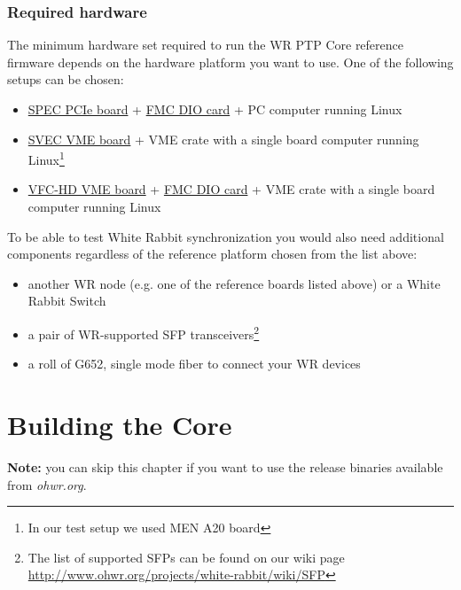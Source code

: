 \documentclass[a4paper, 12pt]{article}
\renewcommand{\_}{\underscore\allowbreak}
\begin{document}
\subsubsection{Required hardware}
\label{Required hardware}

The minimum hardware set required to run the WR PTP Core reference firmware
depends on the hardware platform you want to use. One of the following setups
can be chosen:
\begin{itemize}
\item \href{http://www.ohwr.org/projects/spec}{SPEC PCIe board} +
  \href{http://www.ohwr.org/projects/fmc-dio-5chttla}{FMC DIO card} + PC
  computer running Linux
\item \href{http://www.ohwr.org/projects/svec}{SVEC VME board} + VME crate with
  a single board computer running Linux\footnote{\label{note_a20}In our test setup
    we used MEN A20 board}
\item \href{http://www.ohwr.org/projects/vfc-hd}{VFC-HD VME board} +
  \href{http://www.ohwr.org/projects/fmc-dio-5chttla}{FMC DIO card} +
  VME crate with a single board computer running Linux
\end{itemize}

To be able to test White Rabbit synchronization you would also need
additional components regardless of the reference platform chosen from the list
above:
\begin{itemize}
  \item another WR node (e.g. one of the reference boards listed above) or a
    White Rabbit Switch
  \item a pair of WR-supported SFP transceivers\footnote{The list of supported
    SFPs can be found on our wiki page
    \url{http://www.ohwr.org/projects/white-rabbit/wiki/SFP}}
  \item a roll of G652, single mode fiber to connect your WR devices
\end{itemize}

\newpage
\section{Building the Core}
\label{Building the Core}

\textbf{Note:} you can skip this chapter if you want to use the release binaries
available from \textit{ohwr.org}.
\end{document}
